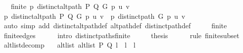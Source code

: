 \begin{isabellebody}
\ \ \ {\isachardoublequoteopen}finite\ {\isacharbraceleft}{\kern0pt}p{\isachardot}{\kern0pt}\ distinct{\isacharunderscore}{\kern0pt}alt{\isacharunderscore}{\kern0pt}path\ P\ Q\ G\ p\ u\ v{\isacharbraceright}{\kern0pt}{\isachardoublequoteclose}\isanewline
%
\isadelimproof
%
\endisadelimproof
%
\isatagproof
{}\isamarkupfalse%
\ {\isacharminus}{\kern0pt}\isanewline
\ \ \isamarkupfalse%
\ {\isachardoublequoteopen}{\isacharbraceleft}{\kern0pt}p{\isachardot}{\kern0pt}\ distinct{\isacharunderscore}{\kern0pt}alt{\isacharunderscore}{\kern0pt}path\ P\ Q\ G\ p\ u\ v{\isacharbraceright}{\kern0pt}\ {\isasymsubseteq}\ {\isacharbraceleft}{\kern0pt}p{\isachardot}{\kern0pt}\ distinct{\isacharunderscore}{\kern0pt}path\ G\ p\ u\ v{\isacharbraceright}{\kern0pt}{\isachardoublequoteclose}\isanewline
\ \ \ \ \isamarkupfalse%
\ {\isacharparenleft}{\kern0pt}auto\ simp\ add{\isacharcolon}{\kern0pt}\ distinct{\isacharunderscore}{\kern0pt}alt{\isacharunderscore}{\kern0pt}path{\isacharunderscore}{\kern0pt}def\ alt{\isacharunderscore}{\kern0pt}path{\isacharunderscore}{\kern0pt}def\ distinct{\isacharunderscore}{\kern0pt}path{\isacharunderscore}{\kern0pt}def{\isacharparenright}{\kern0pt}\isanewline
\ \ \isamarkupfalse%
\ \isamarkupfalse%
\ {\isachardoublequoteopen}finite\ {\isachardot}{\kern0pt}{\isachardot}{\kern0pt}{\isachardot}{\kern0pt}{\isachardoublequoteclose}\isanewline
\ \ \ \ \isamarkupfalse%
\ finite{\isacharunderscore}{\kern0pt}edges\isanewline
\ \ \ \ \isamarkupfalse%
\ {\isacharparenleft}{\kern0pt}intro\ distinct{\isacharunderscore}{\kern0pt}paths{\isacharunderscore}{\kern0pt}finite{\isacharparenright}{\kern0pt}\isanewline
\ \ \isamarkupfalse%
\ \isamarkupfalse%
\ {\isacharquery}{\kern0pt}thesis\isanewline
\ \ \ \ \isamarkupfalse%
\ {\isacharparenleft}{\kern0pt}rule\ finite{\isacharunderscore}{\kern0pt}subset{\isacharparenright}{\kern0pt}\isanewline
{}\isamarkupfalse%
%
\endisatagproof
{\isafoldproof}%
%
\isadelimproof
\isanewline
%
\endisadelimproof
%
\isadeliminvisible
\isanewline
%
\endisadeliminvisible
%
\isataginvisible
{}\isamarkupfalse%
\ alt{\isacharunderscore}{\kern0pt}list{\isacharunderscore}{\kern0pt}decomp{\isacharcolon}{\kern0pt}\isanewline
\ \ \ alt{\isacharunderscore}{\kern0pt}list{\isacharcolon}{\kern0pt}\ {\isachardoublequoteopen}alt{\isacharunderscore}{\kern0pt}list\ P\ Q\ {\isacharparenleft}{\kern0pt}l{}\ {\isacharat}{\kern0pt}\ l{}\ {\isacharat}{\kern0pt}\ l{}{\isacharparenright}{\kern0pt}{\isachardoublequoteclose}\isanewline

\end{isabellebody}
